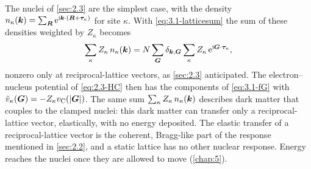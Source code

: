 The nuclei of \cref{sec:2.3} are the simplest case, with the density $n_\kappa(\bm{k}) = \sum_{\bm{R}}\mathrm{e}^{\mathrm{i}\bm{k}\cdot(\bm{R} + \bm{\tau}_\kappa)}$ for site $\kappa$. With \cref{eq:3.1-latticesum} the sum of these densities weighted by $Z_\kappa$ becomes
\begin{equation*}
  \sum_\kappa Z_\kappa\,n_\kappa(\bm{k}) = N\sum_{\bm{G}}\delta_{\bm{k},\bm{G}}\sum_\kappa Z_\kappa\,\mathrm{e}^{\mathrm{i}\bm{G}\cdot\bm{\tau}_\kappa} ,
\end{equation*}
nonzero only at reciprocal-lattice vectors, as \cref{sec:2.3} anticipated. The electron--nucleus potential of \cref{eq:2.3-HC} then has the components of \cref{eq:3.1-fG} with $\tilde v_\kappa(\bm{G}) = -Z_\kappa v_{\mathrm{C}}(|\bm{G}|)$. The same sum $\sum_\kappa Z_\kappa\,n_\kappa(\bm{k})$ describes dark matter that couples to the clamped nuclei: this dark matter can transfer only a reciprocal-lattice vector, elastically, with no energy deposited. The elastic transfer of a reciprocal-lattice vector is the coherent, Bragg-like part of the response mentioned in \cref{sec:2.2}, and a static lattice has no other nuclear response. Energy reaches the nuclei once they are allowed to move (\cref{chap:5}).

